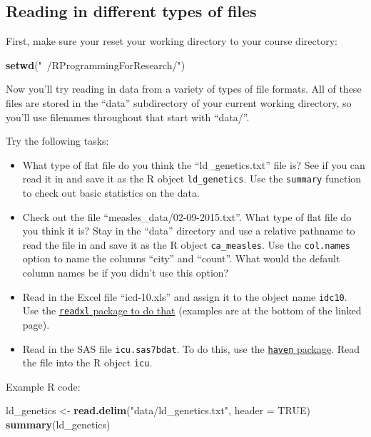 \documentclass[]{book}
\makeatletter
\newenvironment{Shaded}{\begin{snugshade}}{\end{snugshade}}
\newcommand{\KeywordTok}[1]{\textcolor[rgb]{0.13,0.29,0.53}{\textbf{#1}}}
\newcommand{\DataTypeTok}[1]{\textcolor[rgb]{0.13,0.29,0.53}{#1}}
\newcommand{\StringTok}[1]{\textcolor[rgb]{0.31,0.60,0.02}{#1}}
\newcommand{\OtherTok}[1]{\textcolor[rgb]{0.56,0.35,0.01}{#1}}
\newcommand{\NormalTok}[1]{#1}
\providecommand{\tightlist}{%
  \setlength{\itemsep}{0pt}\setlength{\parskip}{0pt}}
\newenvironment{kframe}{%
\medskip{}
\setlength{\fboxsep}{.8em}
 \def\at@end@of@kframe{}%
 \ifinner\ifhmode%
  \def\at@end@of@kframe{\end{minipage}}%
  \begin{minipage}{\columnwidth}%
 \fi\fi%
 \def\FrameCommand##1{\hskip\@totalleftmargin \hskip-\fboxsep
 \colorbox{shadecolor}{##1}\hskip-\fboxsep
     \hskip-\linewidth \hskip-\@totalleftmargin \hskip\columnwidth}%
 \MakeFramed {\advance\hsize-\width
   \@totalleftmargin\z@ \linewidth\hsize
   \@setminipage}}%
 {\par\unskip\endMakeFramed%
 \at@end@of@kframe}
\renewenvironment{Shaded}{\begin{kframe}}{\end{kframe}}
\theoremstyle{definition}
\theoremstyle{definition}
\theoremstyle{definition}
\theoremstyle{remark}
\makeatother
\begin{document}
\subsection{Reading in different types of
files}\label{reading-in-different-types-of-files}

First, make sure your reset your working directory to your course
directory:

\begin{Shaded}
\begin{Highlighting}[]
\KeywordTok{setwd}\NormalTok{(}\StringTok{"~/RProgrammingForResearch/"}\NormalTok{)}
\end{Highlighting}
\end{Shaded}

Now you'll try reading in data from a variety of types of file formats.
All of these files are stored in the ``data'' subdirectory of your
current working directory, so you'll use filenames throughout that start
with ``data/''.

Try the following tasks:

\begin{itemize}
\tightlist
\item
  What type of flat file do you think the ``ld\_genetics.txt'' file is?
  See if you can read it in and save it as the R object
  \texttt{ld\_genetics}. Use the \texttt{summary} function to check out
  basic statistics on the data.
\item
  Check out the file ``measles\_data/02-09-2015.txt''. What type of flat
  file do you think it is? Stay in the ``data'' directory and use a
  relative pathname to read the file in and save it as the R object
  \texttt{ca\_measles}. Use the \texttt{col.names} option to name the
  columns ``city'' and ``count''. What would the default column names be
  if you didn't use this option?
\item
  Read in the Excel file ``icd-10.xls'' and assign it to the object name
  \texttt{idc10}. Use the
  \href{https://github.com/hadley/readxl}{\texttt{readxl} package to do
  that} (examples are at the bottom of the linked page).
\item
  Read in the SAS file \texttt{icu.sas7bdat}. To do this, use the
  \href{https://github.com/hadley/haven}{\texttt{haven} package}. Read
  the file into the R object \texttt{icu}.
\end{itemize}

Example R code:

\begin{Shaded}
\begin{Highlighting}[]
\NormalTok{ld_genetics <-}\StringTok{ }\KeywordTok{read.delim}\NormalTok{(}\StringTok{"data/ld_genetics.txt"}\NormalTok{, }\DataTypeTok{header =} \OtherTok{TRUE}\NormalTok{)}
\KeywordTok{summary}\NormalTok{(ld_genetics)}
\end{Highlighting}
\end{Shaded}
\end{document}

